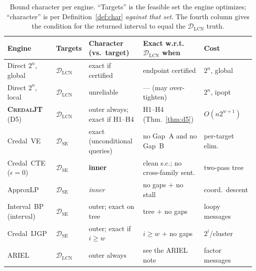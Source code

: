 \documentclass[11pt]{article}
\theoremstyle{definition}
\newcommand{\DSE}{\mathcal{D}_{\mathrm{SE}}}
\newcommand{\DLCN}{\mathcal{D}_{\mathrm{LCN}}}
\begin{document}
\begin{table}[ht]\centering\footnotesize
\caption{Bound character per engine. ``Targets'' is the feasible set the engine
optimizes; ``character'' is per Definition~\ref{def:char} \emph{against that
set}. The fourth column gives the condition for the returned interval to equal
the $\DLCN$ truth.}\label{tab:master}
\setlength{\tabcolsep}{4pt}
\begin{tabular}{@{}lllll@{}}
\toprule
Engine & Targets & Character (vs.\ target) & Exact w.r.t.\ $\DLCN$ when & Cost \\
\midrule
Direct $2^n$, global & $\DLCN$ & exact if certified &
  endpoint certified & $2^n$, global \\
Direct $2^n$, local  & $\DLCN$ & unreliable &
  --- (may over-tighten) & $2^n$, ipopt \\
\textbf{\textsc{CredalJT}} (D5)  & $\DLCN$ & outer always; exact if H1--H4 &
  H1--H4 (Thm.~\ref{thm:d5}) & $O(n2^{w+1})$ \\
\midrule
Credal~VE                        & $\DSE$ & exact (unconditional queries) &
  no Gap~A and no Gap~B & per-target elim.\ \\
Credal~CTE ($\epsilon{=}0$)      & $\DSE$ & \textbf{inner} &
  clean s.c.; no cross-family sent. & two-pass tree \\
ApproxLP                         & $\DSE$ & \emph{inner} &
  no gaps $+$ no stall & coord.\ descent \\
Interval~BP (interval)  & $\DSE$ & outer; exact on tree &
  tree $+$ no gaps & loopy messages \\
Credal~IJGP                      & $\DSE$ & outer; exact if $i\ge w$ &
  $i\ge w$ $+$ no gaps & $2^i$/cluster \\
\midrule
ARIEL                            & $\DLCN$ & outer always &
  see the ARIEL note & factor messages \\
\bottomrule
\end{tabular}
\end{table}
\end{document}
